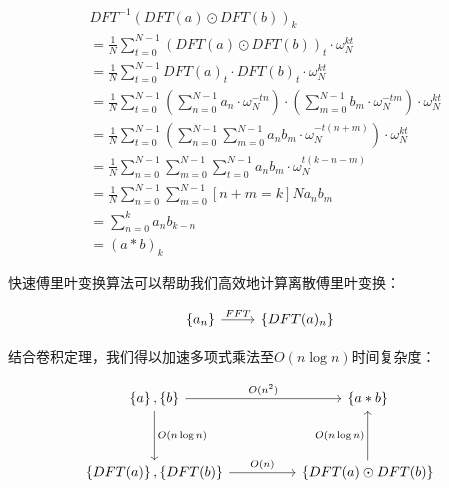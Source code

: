 \documentclass[UTF8]{book}
\begin{document}
\begin{large}
    \begin{equation}
        \begin{aligned}
            &DFT^{-1}\left ( DFT(a) \odot DFT(b) \right )_k \\
            &= \frac{1}{N}\sum_{t=0}^{N-1}\left ( DFT(a) \odot DFT(b) \right )_t \cdot \omega_N^{kt}\\
            &= \frac{1}{N}\sum_{t=0}^{N-1} DFT(a)_t \cdot DFT(b)_t \cdot \omega_N^{kt} \\
            &= \frac{1}{N}\sum_{t=0}^{N-1} \left ( \sum_{n=0}^{N-1}{a_n \cdot \omega_{N}^{-tn}} \right ) \cdot \left ( \sum_{m=0}^{N-1}{b_m \cdot \omega_{N}^{-tm}} \right ) \cdot \omega_N^{kt} \\
            &= \frac{1}{N}\sum_{t=0}^{N-1} \left ( \sum_{n=0}^{N-1}\sum_{m=0}^{N-1}a_nb_m \cdot \omega_N^{-t(n+m)} \right ) \cdot \omega_N^{kt} \\
            &= \frac{1}{N}\sum_{n=0}^{N-1}\sum_{m=0}^{N-1}\sum_{t=0}^{N-1}a_nb_m \cdot \omega_N^{t(k-n-m)} \\
            &= \frac{1}{N}\sum_{n=0}^{N-1}\sum_{m=0}^{N-1}\left [ n+m=k \right ]Na_nb_m \\
            &= \sum_{n=0}^{k}a_nb_{k-n} \\
            &= (a*b)_k
            \nonumber
        \end{aligned}
    \end{equation}
\end{large}
快速傅里叶变换算法可以帮助我们高效地计算离散傅里叶变换：
\begin{large}
    \begin{equation}
        \begin{aligned}
            \begin{tikzcd}
                \left \{ a_n \right \} \arrow[r,"FFT"] & \left \{ DFT(a)_n \right \}
            \end{tikzcd}
            \nonumber
        \end{aligned}
    \end{equation}
\end{large}
结合卷积定理，我们得以加速多项式乘法至$O(n\log n)$时间复杂度：
\begin{large}
    \begin{equation}
        \begin{aligned}
            \begin{tikzcd}
                \left \{ a \right \}, \left \{ b \right \} \arrow[dd,"O(n\log n)"] \arrow[rr,"O(n^2)"] & & \left \{ a*b \right \} \\
                & & \\
                \left \{ DFT(a) \right \}, \left \{ DFT(b) \right \} \arrow[rr,"O(n)"] & & \left \{ DFT(a) \odot DFT(b) \right \} \arrow[uu,"O(n\log n)"]
            \end{tikzcd}
            \nonumber
        \end{aligned}
    \end{equation}
\end{large}
\end{document}
